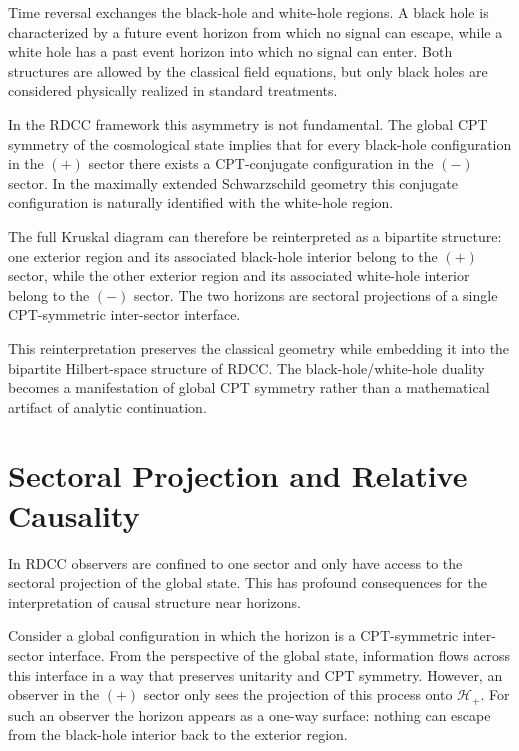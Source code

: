 \documentclass[11pt,a4paper]{article}
\begin{document}
Time reversal exchanges the black-hole and white-hole regions. A black hole is
characterized by a future event horizon from which no signal can escape, while a white
hole has a past event horizon into which no signal can enter. Both structures are allowed
by the classical field equations, but only black holes are considered physically realized in
standard treatments.

In the RDCC framework this asymmetry is not fundamental. The global CPT symmetry
of the cosmological state implies that for every black-hole configuration in the $(+)$ sector
there exists a CPT-conjugate configuration in the $(-)$ sector. In the maximally extended
Schwarzschild geometry this conjugate configuration is naturally identified with the
white-hole region.

The full Kruskal diagram can therefore be reinterpreted as a bipartite structure: one
exterior region and its associated black-hole interior belong to the $(+)$ sector, while the
other exterior region and its associated white-hole interior belong to the $(-)$ sector. The
two horizons are sectoral projections of a single CPT-symmetric inter-sector interface.

This reinterpretation preserves the classical geometry while embedding it into the
bipartite Hilbert-space structure of RDCC. The black-hole/white-hole duality becomes a
manifestation of global CPT symmetry rather than a mathematical artifact of analytic
continuation.


\section{Sectoral Projection and Relative Causality}

In RDCC observers are confined to one sector and only have access to the sectoral
projection of the global state. This has profound consequences for the interpretation of
causal structure near horizons.

Consider a global configuration in which the horizon is a CPT-symmetric inter-sector
interface. From the perspective of the global state, information flows across this interface
in a way that preserves unitarity and CPT symmetry. However, an observer in the $(+)$
sector only sees the projection of this process onto $\mathcal{H}_{+}$. For such an observer
the horizon appears as a one-way surface: nothing can escape from the black-hole interior
back to the exterior region.
\end{document}
